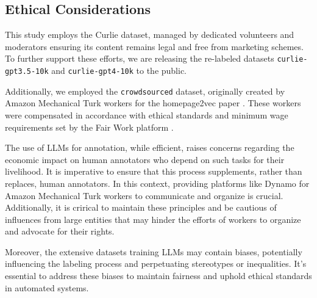 \subsection{Ethical Considerations}\label{appendix:ethical-considerations}
This study employs the Curlie dataset, managed by dedicated volunteers and moderators ensuring its content remains legal and free from marketing schemes. 
To further support these efforts, we are releasing the re-labeled datasets \texttt{curlie-gpt3.5-10k} and \texttt{curlie-gpt4-10k} to the public.

Additionally, we employed the \texttt{crowdsourced} dataset, originally created by Amazon Mechanical Turk workers for the homepage2vec paper \cite{homepage2vec}. 
These workers were compensated in accordance with ethical standards and minimum wage requirements set by the Fair Work platform \cite{ethics2}.


The use of LLMs for annotation, while efficient, raises concerns regarding the economic impact on human annotators who depend on such tasks for their livelihood. 
It is imperative to ensure that this process supplements, rather than replaces, human annotators. In this context, providing platforms like Dynamo \cite{ethics1} for Amazon Mechanical Turk workers to communicate and organize is crucial.
Additionally, it is crirical to maintain these principles and be cautious of influences from large entities that may hinder the efforts of workers to organize and advocate for their rights.

Moreover, the extensive datasets training LLMs may contain biases, potentially influencing the labeling process and perpetuating stereotypes or inequalities. 
It's essential to address these biases to maintain fairness and uphold ethical standards in automated systems.